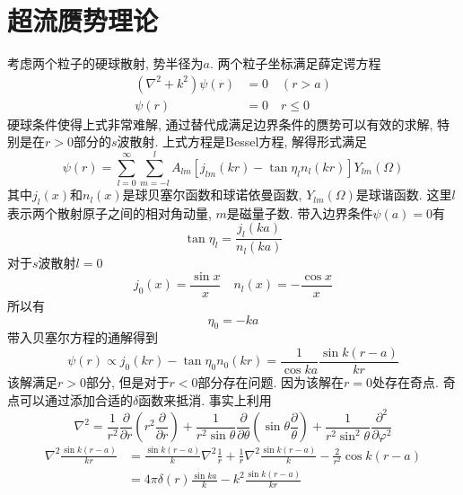 \documentclass[a4paper,11pt]{article}
\begin{document}
\section{超流赝势理论}
考虑两个粒子的硬球散射, 势半径为$a$. 两个粒子坐标满足薛定谔方程
\begin{equation*}
  \begin{split}
     (\nabla^2+k^2)\psi(r)&=0\quad(r>a) \\
       \psi(r)&=0\quad r\leq 0
  \end{split}
\end{equation*}
硬球条件使得上式非常难解, 通过替代成满足边界条件的赝势可以有效的求解, 特别是在$r>0$部分的$s$波散射. 上式方程是Bessel方程, 解得形式满足
\begin{equation*}
  \psi(r)=\sum_{l=0}^{\infty}\sum_{m=-l}^{l}A_{lm}[j_{lm}(kr)-\tan \eta_l n_l(kr)]Y_{lm}(\Omega)
\end{equation*}
其中$j_l(x)$和$n_l(x)$是球贝塞尔函数和球诺依曼函数, $Y_{lm}(\Omega)$是球谐函数. 这里$l$表示两个散射原子之间的相对角动量, $m$是磁量子数. 带入边界条件$\psi(a)=0$有
\begin{equation*}
  \tan\eta_l=\frac{j_l(ka)}{n_l(ka)}
\end{equation*}
对于$s$波散射$l=0$
\begin{equation*}
  j_0(x)=\frac{\sin x}{x}\quad n_l(x)=-\frac{\cos x}{x}
\end{equation*}
所以有
\begin{equation*}
  \eta_0=-ka
\end{equation*}
带入贝塞尔方程的通解得到
\begin{equation*}
  \psi(r)\propto j_0(kr)-\tan\eta_0n_0(kr)=\frac{1}{\cos ka}\frac{\sin k(r-a)}{kr}
\end{equation*}
该解满足$r>0$部分, 但是对于$r<0$部分存在问题. 因为该解在$r=0$处存在奇点. 奇点可以通过添加合适的$\delta$函数来抵消. 事实上利用
\begin{equation*}
  \nabla^2=\frac{1}{r^2}\frac{\partial}{\partial r}\left(r^2\frac{\partial}{\partial r}\right)+\frac{1}{r^2\sin\theta}\frac{\partial}{\partial\theta}\left(\sin\theta\frac{\partial}{\theta}\right)+\frac{1}{r^2\sin^2\theta}\frac{\partial^2}{\partial\varphi^2}
\end{equation*}
\begin{equation*}
  \begin{split}
     \nabla^2\frac{\sin{k(r-a)}}{kr}&=\frac{\sin{k(r-a)}}{k}\nabla^2\frac{1}{r}+\frac{1}{r}\nabla^2\frac{\sin{k(r-a)}}{k}-\frac{2}{r^2}\cos{k(r-a)} \\
       &=4\pi\delta(r)\frac{\sin ka}{k}-k^2\frac{\sin k(r-a)}{kr}
  \end{split}
\end{equation*}
\end{document}
